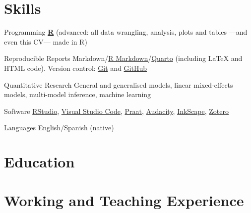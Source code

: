 \documentclass[11pt,a4paper,]{awesome-cv}
\begin{document}
\section{Skills}\label{skills}

\begin{cvskills}
  \cvskill
    {Programming}
    {\href{https://www.r-project.org/}{\textbf{R}} (advanced: all data wrangling, analysis, plots and tables —and even this CV— made in R)}

  \cvskill
    {Reproducible Reports}
    {Markdown/\href{https://rmarkdown.rstudio.com/}{R Markdown}/\href{https://quarto.org/}{Quarto} (including {\selectfont\LaTeX} and HTML code). Version control: \href{https://git-scm.com/}{Git} \faGit* and \href{https://github.com/JDLeongomez}{GitHub} \faGithub}

  \cvskill
    {Quantitative Research}
    {General and generalised models, linear mixed-effects models, multi-model inference, machine learning}

  \cvskill
    {Software}
    {\href{https://posit.co/products/open-source/rstudio/}{RStudio}, \href{https://code.visualstudio.com/}{Visual Studio Code}, \href{https://www.fon.hum.uva.nl/praat/}{Praat}, \href{https://www.audacityteam.org/}{Audacity}, \href{https://inkscape.org/}{InkScape}, \href{https://www.zotero.org/}{Zotero}}

  \cvskill
    {Languages}
    {English/Spanish (native)}
\end{cvskills}

\section{Education}\label{education}

\begin{cventries}
    \vspace{-4.0mm}
    \vspace{-4.0mm}
    \vspace{-4.0mm}
\end{cventries}

\section{Working and Teaching
Experience}\label{working-and-teaching-experience}
\end{document}
